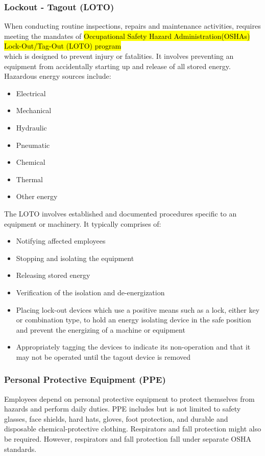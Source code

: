 \documentclass{article}
\begin{document}
\subsubsection{Lockout - Tagout (LOTO)}

When conducting routine inspections, repairs and maintenance activities, requires meeting the mandates of \hl{Occupational Safety  Hazard Administration(OSHAs) Lock-Out/Tag-Out (LOTO) program}\\
which is designed to prevent injury or fatalities.  It involves preventing an equipment from accidentally starting up and release of all stored energy.  Hazardous energy sources include: 
\begin{itemize}
\item Electrical 
\item Mechanical
\item Hydraulic
\item Pneumatic 
\item Chemical 
\item Thermal  
\item Other energy
\end{itemize}

The LOTO involves established and documented procedures specific to an equipment or machinery.  It typically comprises of:\\
\begin{itemize}
\item Notifying affected employees
\item Stopping and isolating the equipment
\item Releasing stored energy
\item Verification of the isolation and de-energization
\item Placing lock-out devices which use a positive means such as a lock, either key or combination type, to hold an energy isolating device in the safe position and prevent the energizing of a machine or equipment
\item Appropriately tagging the devices to indicate its non-operation and that it may not be operated until the tagout device is removed
\end{itemize}

\subsubsection{Personal Protective Equipment (PPE)}
Employees depend on personal protective equipment to protect themselves from hazards and perform daily duties. PPE includes but is not limited to safety glasses, face shields, hard hats, gloves, foot protection, and durable and disposable chemical-protective clothing. Respirators and fall protection might also be required. However, respirators and fall protection fall under separate OSHA standards. \\
\end{document}
